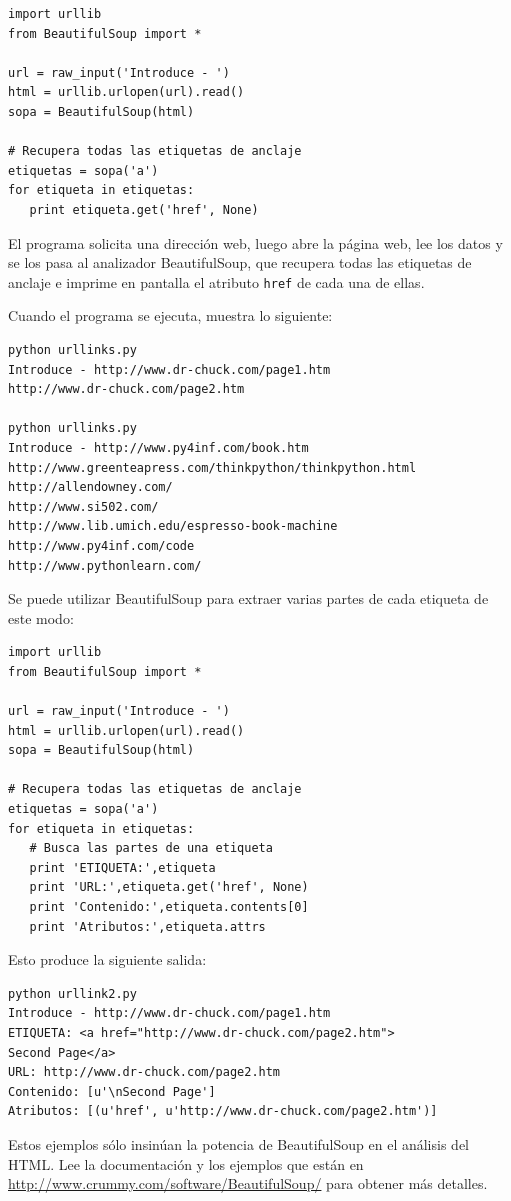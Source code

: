 \beforeverb
\begin{verbatim}
import urllib
from BeautifulSoup import *

url = raw_input('Introduce - ')
html = urllib.urlopen(url).read()
sopa = BeautifulSoup(html)

# Recupera todas las etiquetas de anclaje
etiquetas = sopa('a')
for etiqueta in etiquetas:
   print etiqueta.get('href', None)
\end{verbatim}
\afterverb
%
El programa solicita una dirección web, luego abre la página
web, lee los datos y se los pasa al analizador BeautifulSoup,
que recupera todas las etiquetas de anclaje e imprime en pantalla
el atributo {\tt href} de cada una de ellas.

Cuando el programa se ejecuta, muestra lo siguiente:

\beforeverb
\begin{verbatim}
python urllinks.py 
Introduce - http://www.dr-chuck.com/page1.htm
http://www.dr-chuck.com/page2.htm

python urllinks.py 
Introduce - http://www.py4inf.com/book.htm
http://www.greenteapress.com/thinkpython/thinkpython.html
http://allendowney.com/
http://www.si502.com/
http://www.lib.umich.edu/espresso-book-machine
http://www.py4inf.com/code
http://www.pythonlearn.com/
\end{verbatim}
\afterverb
%
Se puede utilizar BeautifulSoup para extraer varias partes de cada
etiqueta de este modo:

\beforeverb
\begin{verbatim}
import urllib
from BeautifulSoup import *

url = raw_input('Introduce - ')
html = urllib.urlopen(url).read()
sopa = BeautifulSoup(html)

# Recupera todas las etiquetas de anclaje
etiquetas = sopa('a')
for etiqueta in etiquetas:
   # Busca las partes de una etiqueta
   print 'ETIQUETA:',etiqueta
   print 'URL:',etiqueta.get('href', None)
   print 'Contenido:',etiqueta.contents[0]
   print 'Atributos:',etiqueta.attrs
\end{verbatim}
\afterverb
%
Esto produce la siguiente salida:

\beforeverb
\begin{verbatim}
python urllink2.py 
Introduce - http://www.dr-chuck.com/page1.htm
ETIQUETA: <a href="http://www.dr-chuck.com/page2.htm">
Second Page</a>
URL: http://www.dr-chuck.com/page2.htm
Contenido: [u'\nSecond Page']
Atributos: [(u'href', u'http://www.dr-chuck.com/page2.htm')]
\end{verbatim}
\afterverb
%
Estos ejemplos sólo insinúan la potencia de BeautifulSoup
en el análisis del HTML. Lee la documentación y
los ejemplos que están en
\url{http://www.crummy.com/software/BeautifulSoup/} para obtener más detalles.

